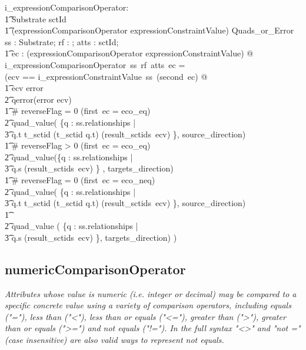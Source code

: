 \documentclass{article}
\def\desc#1{{\small \textsl{{#1}} }}
\begin{document}
\begin{gendef}
   i\_expressionComparisonOperator: \\
\t1 Substrate \fun \optional[reverseFlag] \fun \power sctId \fun \\
\t1 (expressionComparisonOperator \cross expressionConstraintValue) \fun Quads\_or\_Error
\where
    \forall ss : Substrate; rf : \optional[reverseFlag]; atts : \power sctId; \\
\t1 ec : (expressionComparisonOperator \cross expressionConstraintValue)  @ \\
    i\_expressionComparisonOperator~ss~rf~atts~ec = \\
    (\LET ecv == i\_expressionConstraintValue~ss~(second~ec) @ \\
\t1 \IF ecv \in \ran error \THEN \\
\t2 qerror(error \inv ecv) \\
\t1 \ELSE \IF \# reverseFlag = 0 \land (first~ec =  eco\_eq) \THEN \\
\t2 quad\_value( \{q : ss.relationships | \\
\t3 q.t \in \ran t\_sctid \land (t\_sctid \inv q.t) \in (result\_sctids~ecv) \}, source\_direction) \\
\t1 \ELSE \IF \# reverseFlag > 0  \land (first~ec =  eco\_eq) \THEN \\
\t2 quad\_value(\{q : ss.relationships | \\
\t3 q.s \in (result\_sctids~ecv) \} , targets\_direction) \\
\t1  \ELSE \IF \# reverseFlag = 0  \land (first~ec =  eco\_neq) \THEN \\
\t2 quad\_value( \{q : ss.relationships | \\
\t3 q.t \in \ran t\_sctid \land (t\_sctid \inv q.t) \notin (result\_sctids~ecv) \}, source\_direction) \\
\t1 \ELSE \\
\t2 quad\_value ( \{q : ss.relationships | \\
\t3 q.s \notin (result\_sctids~ecv) \}, targets\_direction) )
 \end{gendef}
 
 \subsection{numericComparisonOperator}
\begin{framed}
\desc{Attributes whose value is numeric (i.e. integer or decimal) may be compared to a specific concrete value using a variety of comparison operators, including equals ("="), less than ("\textless"), less than or equals ("\textless="), greater than ("\textgreater"), greater than or equals ("\textgreater=") and not equals ("!="). In the full syntax "\textless\textgreater" and "not =" (case insensitive) are also valid ways to represent not equals.}
\end{framed}
\end{document}
